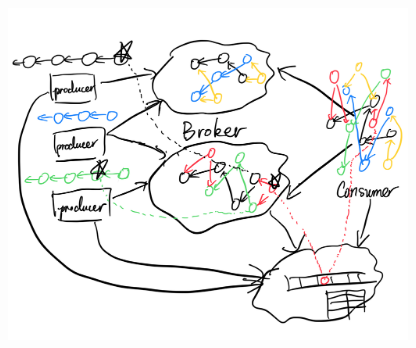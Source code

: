 \begin{figure}[H]
    \includegraphics[width=300pt]{graphs/IMG_0052}
    \Description{}
\end{figure}

